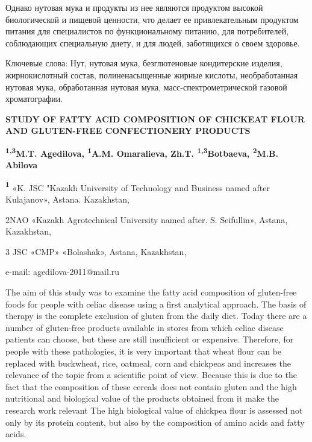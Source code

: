 Однако нутовая мука и продукты из нее являются продуктом высокой
биологической и пищевой ценности, что делает ее привлекательным
продуктом питания для специалистов по функциональному питанию, для
потребителей, соблюдающих специальную диету, и для людей, заботящихся о
своем здоровье.

Ключевые слова: Нут, нутовая мука, безглютеновые кондитерские изделия,
жирнокислотный состав, полиненасыщенные жирные кислоты, необработанная
нутовая мука, обработанная нутовая мука, масс-спектрометрической газовой
хроматографии.

{\bfseries STUDY OF FATTY ACID COMPOSITION OF CHICKEAT FLOUR AND
GLUTEN-FREE CONFECTIONERY PRODUCTS}

{\bfseries \textsuperscript{1,3}M.T. Agedilova\textsuperscript{\envelope },
\textsuperscript{1}A.M. Omaralieva, Zh.T. \textsuperscript{1,3}Botbaeva,
\textsuperscript{2}M.B. Abilova}

{\bfseries \textsuperscript{1}} «K. JSC "Kazakh University of Technology
and Business named after Kulajanov», Astana. Kazakhstan,

2NAO «Kazakh Agrotechnical University named after. S. Seifullin»,
Astana, Kazakhstan,

3 JSC «CMP» «Bolashak», Astana, Kazakhstan,

e-mail: agedilova-2011@mail.ru

The aim of this study was to examine the fatty acid composition of
gluten-free foods for people with celiac disease using a first
analytical approach. The basis of therapy is the complete exclusion of
gluten from the daily diet. Today there are a number of gluten-free
products available in stores from which celiac disease patients can
choose, but these are still insufficient or expensive. Therefore, for
people with these pathologies, it is very important that wheat flour can
be replaced with buckwheat, rice, oatmeal, corn and chickpeas and
increases the relevance of the topic from a scientific point of view.
Because this is due to the fact that the composition of these cereals
does not contain gluten and the high nutritional and biological value of
the products obtained from it make the research work relevant The high
biological value of chickpea flour is assessed not only by its protein
content, but also by the composition of amino acids and fatty acids.

